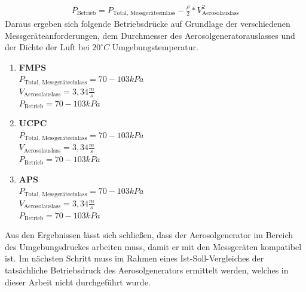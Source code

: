 \begin{align*}
	P_\text{Betrieb} = P_\text{Total, Messger\"{a}teeinlass} - \frac{\rho}{2} * V_			\text{Aerosolauslass}^2
\end{align*}
Daraus ergeben sich folgende Betriebsdr\"{u}cke auf Grundlage der verschiedenen Messger\"{a}teanforderungen, dem Durchmesser des Aerosolgeneratorauslasses und der Dichte der Luft bei \(20^\circ C\) Umgebungstemperatur\cite{fmps_3091}\cite{ops_3330}\cite{ucpc_3776}\cite{aps_3321}\cite{topas}.
\begin{enumerate}
	\item \textbf{FMPS}\\
	\(P_\text{Total, Messger\"{a}teeinlass} = 70 - 103 kPa\)\\
	\(V_\text{Aerosolauslass} = 3,34 \frac{m}{s}\)\\
	\(P_\text{Betrieb} = 70 - 103 kPa\)\\
	\item \textbf{UCPC}\\
	\(P_\text{Total, Messger\"{a}teeinlass} = 70 - 103 kPa\)\\
	\(V_\text{Aerosolauslass} = 3,34 \frac{m}{s}\)\\
	\(P_\text{Betrieb} = 70 - 103 kPa\)\\
	\item \textbf{APS}\\
	\(P_\text{Total, Messger\"{a}teeinlass} = 70 - 103 kPa\)\\
	\(V_\text{Aerosolauslass} = 3,34 \frac{m}{s}\)\\
	\(P_\text{Betrieb} = 70 - 103 kPa\)
\end{enumerate} 
Aus den Ergebnissen l\"{a}sst sich schlie{\ss}en, dass der Aerosolgenerator im Bereich des Umgebungsdruckes arbeiten muss, damit er mit den Messger\"{a}ten kompatibel ist. Im n\"{a}chsten Schritt muss im Rahmen eines Ist-Soll-Vergleiches der tats\"{a}chliche Betriebsdruck des Aerosolgenerators ermittelt werden, welches in dieser Arbeit nicht durchgef\"{u}hrt wurde.
